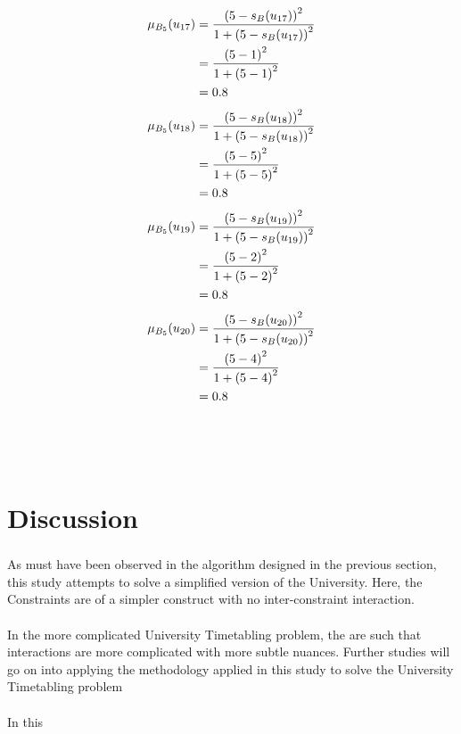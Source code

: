 \documentclass[a4paper]{book}
\begin{document}
				\begin{align}
					\mu_{B_5}(u_{17}) &= \frac{\left(5-s_B(u_{17})\right)^2}{1 + \left(5-s_B(u_{17})\right)^2}\\
					&= \frac{\left(5-1\right)^2}{1 + \left(5-1\right)^2} \notag \\
					&= 0.8 \notag
				\end{align}
				\begin{align}
					\mu_{B_5}(u_{18}) &= \frac{\left(5-s_B(u_{18})\right)^2}{1 + \left(5-s_B(u_{18})\right)^2}\\
					&= \frac{\left(5-5\right)^2}{1 + \left(5-5\right)^2} \notag \\
					&= 0.8 \notag
				\end{align}
				\begin{align}
					\mu_{B_5}(u_{19}) &= \frac{\left(5-s_B(u_{19})\right)^2}{1 + \left(5-s_B(u_{19})\right)^2}\\
					&= \frac{\left(5-2\right)^2}{1 + \left(5-2\right)^2} \notag \\
					&= 0.8 \notag
				\end{align}
				\begin{align}
					\mu_{B_5}(u_{20}) &= \frac{\left(5-s_B(u_{20})\right)^2}{1 + \left(5-s_B(u_{20})\right)^2}\\
					&= \frac{\left(5-4\right)^2}{1 + \left(5-4\right)^2} \notag \\
					&= 0.8 \notag
				\end{align}
				\\
				\\
				\\
	\chapter{Discussion}
	\paragraph{}
	As must have been observed in the algorithm designed in the previous section, this study attempts to solve a simplified version of the University. Here, the Constraints are of a simpler construct with no inter-constraint interaction.\\ \\
	In the more complicated University Timetabling problem, the are such that interactions are more complicated with more subtle nuances. Further studies will go on into applying the methodology applied in this study to solve the University Timetabling problem\\ \\
	In this
\end{document}
